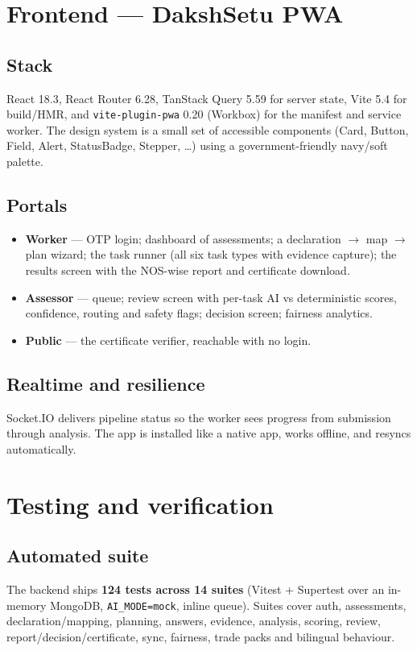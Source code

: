\documentclass[11pt,a4paper]{article}
\newcommand{\code}[1]{\texttt{\small #1}}
\begin{document}
\section{Frontend --- DakshSetu PWA}
\subsection{Stack}
React 18.3, React Router 6.28, TanStack Query 5.59 for server state, Vite 5.4
for build/HMR, and \code{vite-plugin-pwa} 0.20 (Workbox) for the manifest and
service worker. The design system is a small set of accessible components
(Card, Button, Field, Alert, StatusBadge, Stepper, \dots) using a
government-friendly navy/soft palette.

\subsection{Portals}
\begin{itemize}
\item \textbf{Worker} --- OTP login; dashboard of assessments; a
      declaration $\rightarrow$ map $\rightarrow$ plan wizard; the task
      runner (all six task types with evidence capture); the results screen
      with the NOS-wise report and certificate download.
\item \textbf{Assessor} --- queue; review screen with per-task AI vs
      deterministic scores, confidence, routing and safety flags; decision
      screen; fairness analytics.
\item \textbf{Public} --- the certificate verifier, reachable with no login.
\end{itemize}

\subsection{Realtime and resilience}
Socket.IO delivers pipeline status so the worker sees progress from submission
through analysis. The app is installed like a native app, works offline, and
resyncs automatically.

\section{Testing and verification}
\subsection{Automated suite}
The backend ships \textbf{124 tests across 14 suites} (Vitest + Supertest over
an in-memory MongoDB, \code{AI_MODE=mock}, inline queue). Suites cover auth,
assessments, declaration/mapping, planning, answers, evidence, analysis,
scoring, review, report/decision/certificate, sync, fairness, trade packs and
bilingual behaviour.
\end{document}
